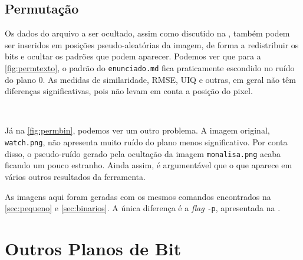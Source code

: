 \subsection{Permutação}

    Os dados do arquivo a ser ocultado, assim como discutido na , também podem ser inseridos em posições pseudo-aleatórias da imagem, de forma a redistribuir os bits e ocultar os padrões que podem aparecer. Podemos ver que para a \cref{fig:permtexto}, o padrão do \texttt{enunciado.md} fica praticamente escondido no ruído do plano 0. As medidas de similaridade, RMSE, UIQ e outras, em geral não têm diferenças significativas, pois não levam em conta a posição do pixel.

    ~

    

    Já na \cref{fig:permbin}, podemos ver um outro problema. A imagem original, \texttt{watch.png}, não apresenta muito ruído do plano menos significativo. Por conta disso, o pseudo-ruído gerado pela ocultação da imagem \texttt{monalisa.png} acaba ficando um pouco estranho. Ainda assim, é argumentável que o que aparece em vários outros resultados da ferramenta.

    As imagens aqui foram geradas com os mesmos comandos encontrados na \cref{sec:pequeno} e \cref{sec:binarios}. A única diferença é a \textit{flag} \texttt{-p}, apresentada na .

    

\section{Outros Planos de Bit}

    
